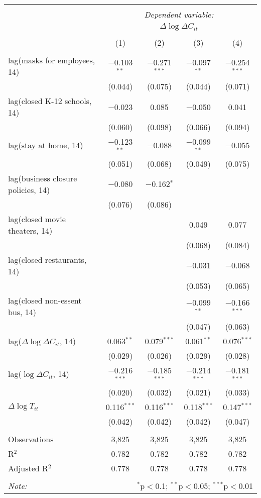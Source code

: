 \begin{tabular}{@{\extracolsep{1pt}}lcccc} 
\\[-1.8ex]\hline 
\hline \\[-1.8ex] 
 & \multicolumn{4}{c}{\textit{Dependent variable:}} \\ 
\cline{2-5} 
 & \multicolumn{4}{c}{$\Delta \log \Delta C_{it}$} \\ 
\\[-1.8ex] & (1) & (2) & (3) & (4)\\ 
\hline \\[-1.8ex] 
 lag(masks for employees, 14) & $-$0.103$^{**}$ & $-$0.271$^{***}$ & $-$0.097$^{**}$ & $-$0.254$^{***}$ \\ 
  & (0.044) & (0.075) & (0.044) & (0.071) \\ 
  lag(closed K-12 schools, 14) & $-$0.023 & 0.085 & $-$0.050 & 0.041 \\ 
  & (0.060) & (0.098) & (0.066) & (0.094) \\ 
  lag(stay at home, 14) & $-$0.123$^{**}$ & $-$0.088 & $-$0.099$^{**}$ & $-$0.055 \\ 
  & (0.051) & (0.068) & (0.049) & (0.075) \\ 
  lag(business closure policies, 14) & $-$0.080 & $-$0.162$^{*}$ &  &  \\ 
  & (0.076) & (0.086) &  &  \\ 
  lag(closed movie theaters, 14) &  &  & 0.049 & 0.077 \\ 
  &  &  & (0.068) & (0.084) \\ 
  lag(closed restaurants, 14) &  &  & $-$0.031 & $-$0.068 \\ 
  &  &  & (0.053) & (0.065) \\ 
  lag(closed non-essent bus, 14) &  &  & $-$0.099$^{**}$ & $-$0.166$^{***}$ \\ 
  &  &  & (0.047) & (0.063) \\ 
  lag($\Delta \log \Delta C_{it}$, 14) & 0.063$^{**}$ & 0.079$^{***}$ & 0.061$^{**}$ & 0.076$^{***}$ \\ 
  & (0.029) & (0.026) & (0.029) & (0.028) \\ 
  lag($\log \Delta C_{it}$, 14) & $-$0.216$^{***}$ & $-$0.185$^{***}$ & $-$0.214$^{***}$ & $-$0.181$^{***}$ \\ 
  & (0.020) & (0.032) & (0.021) & (0.033) \\ 
  $\Delta \log T_{it}$ & 0.116$^{***}$ & 0.116$^{***}$ & 0.118$^{***}$ & 0.147$^{***}$ \\ 
  & (0.042) & (0.042) & (0.042) & (0.047) \\ 
 \hline \\[-1.8ex] 
Observations & 3,825 & 3,825 & 3,825 & 3,825 \\ 
R$^{2}$ & 0.782 & 0.782 & 0.782 & 0.782 \\ 
Adjusted R$^{2}$ & 0.778 & 0.778 & 0.778 & 0.778 \\ 
\hline 
\hline \\[-1.8ex] 
\textit{Note:}  & \multicolumn{4}{r}{$^{*}$p$<$0.1; $^{**}$p$<$0.05; $^{***}$p$<$0.01} \\ 
\end{tabular} 
